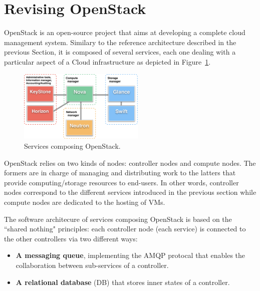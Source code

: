 \section{Revising OpenStack}
\label{sec:leveraging-openstack}

OpenStack is an open-source project that aims at developing a complete cloud management
system. Similary to the reference architecture described in the previous Section, it is
composed of several services, each one dealing with a particular
aspect of a Cloud infrastructure as depicted in Figure~\ref{fig:openstack}.

\begin{figure}[htbp]
        \centering
        \includegraphics[width=6cm]{figures/OpenStack_architecture.pdf}
\vspace*{-.3cm}
        \caption{Services composing OpenStack.}
        \label{fig:openstack}
\vspace*{-.3cm}
\end{figure}


OpenStack relies on two kinds of nodes: controller nodes and compute nodes. The
formers are in charge of managing and distributing work to the latters that
provide computing/storage resources to end-users. In other words, controller
nodes correspond to the different services introduced in the previous
section while compute nodes are dedicated to the hosting of VMs.

The software architecure of services composing OpenStack is based on the
``shared nothing" principles: each controller node (\ie each service) is 
connected to the other controllers via two different ways:

\begin{itemize}
   \setlength{\itemsep}{0pt}
  \setlength{\parskip}{0pt}
   \setlength{\parsep}{0pt}
\item \textbf{A messaging queue}, implementing the AMQP protocal that enables
the collaboration between sub-services of a controller.
\item \textbf{A relational database} (DB) that stores inner states of a controller.
\end{itemize}


